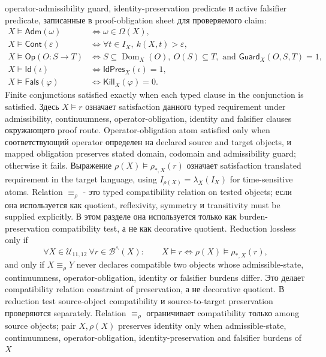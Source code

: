 operator-admissibility guard, identity-preservation predicate и active
falsifier predicate, записанные в proof-obligation sheet для проверяемого
claim:
\[
\begin{aligned}
X\models\mathsf{Adm}(\omega) &\Longleftrightarrow
  \omega\in\Omega(X),\\
X\models\mathsf{Cont}(\varepsilon) &\Longleftrightarrow
  \forall t\in I_X,\ k(X,t)>\varepsilon,\\
X\models\mathsf{Op}(O:S\to T) &\Longleftrightarrow
  S\subseteq\operatorname{Dom}_X(O),\ O(S)\subseteq T,\text{ and }
  \mathsf{Guard}_X(O,S,T)=1,\\
X\models\mathsf{Id}(\iota) &\Longleftrightarrow
  \mathsf{IdPres}_X(\iota)=1,\\
X\models\mathsf{Fals}(\varphi) &\Longleftrightarrow
  \mathsf{Kill}_X(\varphi)=0.
\end{aligned}
\]
Finite conjunctions satisfied exactly when each typed clause in the conjunction
is satisfied. Здесь \(X\models r\) означает satisfaction данного typed
requirement under admissibility, continuumness, operator-obligation,
identity and falsifier clauses окружающего proof route. Operator-obligation
atom satisfied only when соответствующий operator определен на declared
source and target objects, и mapped obligation preserves stated domain,
codomain and admissibility guard; otherwise it fails. Выражение
\(\rho(X)\models\rho_{\ast,X}(r)\) означает satisfaction translated
requirement in the target language, using \(I_{\rho(X)}=\lambda_X(I_X)\) for
time-sensitive atoms. Relation \(\equiv_{\rho}\) - это typed compatibility
relation on tested objects; если она используется как quotient, reflexivity,
symmetry и transitivity must be supplied explicitly. В этом разделе она
используется только как burden-preservation compatibility test, а не как
decorative quotient. Reduction lossless only if
\[
  \forall X\in\mathcal{U}_{11,12}\ \forall r\in\mathcal{B}^{\wedge}(X):
  \qquad X\models r \Longleftrightarrow \rho(X)\models \rho_{\ast,X}(r),
\]
and only if \(X\equiv_{\rho}Y\) never declares compatible two objects whose
admissible-state, continuumness, operator-obligation, identity or falsifier
burdens differ. Это делает compatibility relation constraint of preservation,
а не decorative quotient. В reduction test source-object compatibility и
source-to-target preservation проверяются separately. Relation \(\equiv_{\rho}\)
ограничивает compatibility только among source objects; pair \(X,\rho(X)\)
preserves identity only when admissible-state, continuumness,
operator-obligation, identity-preservation and falsifier burdens of \(X\)
